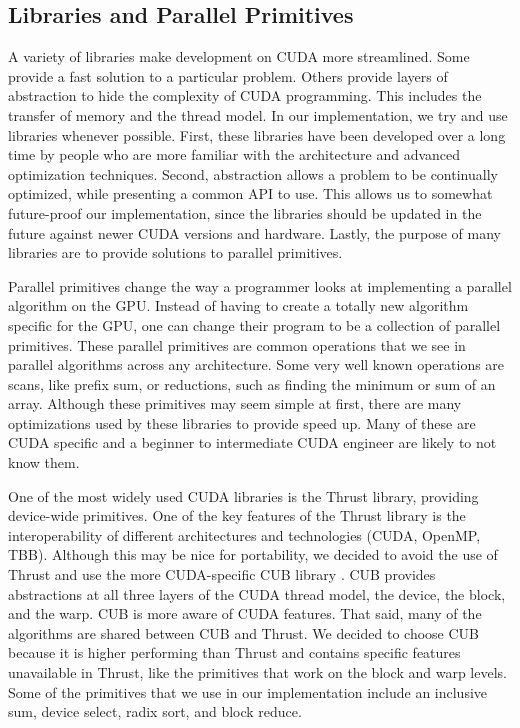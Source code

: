 \subsection{Libraries and Parallel Primitives}
\label{sec:primitives}

A variety of libraries make development on CUDA more streamlined.
Some provide a fast solution to a particular problem.
Others provide layers of abstraction to hide the complexity of CUDA programming.
This includes the transfer of memory and the thread model.
In our implementation, we try and use libraries whenever possible.
First, these libraries have been developed over a long time by people who are more familiar with the architecture and advanced optimization techniques.
Second, abstraction allows a problem to be continually optimized, while presenting a common API to use.
This allows us to somewhat future-proof our implementation, since the libraries should be updated in the future against newer CUDA versions and hardware.
Lastly, the purpose of many libraries are to provide solutions to parallel primitives.

Parallel primitives change the way a programmer looks at implementing a parallel algorithm on the GPU.
Instead of having to create a totally new algorithm specific for the GPU, one can change their program to be a collection of parallel primitives.
These parallel primitives are common operations that we see in parallel algorithms across any architecture.
Some very well known operations are scans, like prefix sum, or reductions, such as finding the minimum or sum of an array.
Although these primitives may seem simple at first, there are many optimizations used by these libraries to provide speed up.
Many of these are CUDA specific and a beginner to intermediate CUDA engineer are likely to not know them.

One of the most widely used CUDA libraries is the Thrust \cite{Thrust} library, providing device-wide primitives.
One of the key features of the Thrust library is the interoperability of different architectures and technologies (CUDA, OpenMP, TBB).
Although this may be nice for portability, we decided to avoid the use of Thrust and use the more CUDA-specific CUB library \cite{CUB}.
CUB provides abstractions at all three layers of the CUDA thread model, the device, the block, and the warp.
CUB is more aware of CUDA features.
That said, many of the algorithms are shared between CUB and Thrust.
We decided to choose CUB because it is higher performing than Thrust \cite{CUB} and contains specific features unavailable in Thrust, like the primitives that work on the block and warp levels.
Some of the primitives that we use in our implementation include an inclusive sum, device select, radix sort, and block reduce.

